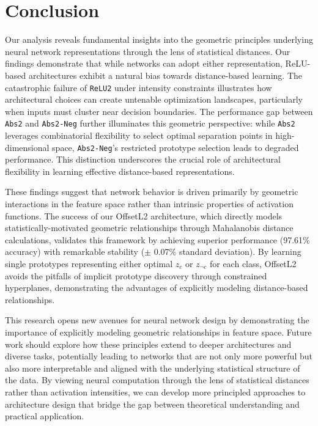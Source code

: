 \section{Conclusion}
\label{sec:conclusion}

Our analysis reveals fundamental insights into the geometric principles underlying neural network representations through the lens of statistical distances. Our findings demonstrate that while networks can adopt either representation, ReLU-based architectures exhibit a natural bias towards distance-based learning. The catastrophic failure of \texttt{ReLU2} under intensity constraints illustrates how architectural choices can create untenable optimization landscapes, particularly when inputs must cluster near decision boundaries. The performance gap between \texttt{Abs2} and \texttt{Abs2-Neg} further illuminates this geometric perspective: while \texttt{Abs2} leverages combinatorial flexibility to select optimal separation points in high-dimensional space, \texttt{Abs2-Neg}'s restricted prototype selection leads to degraded performance. This distinction underscores the crucial role of architectural flexibility in learning effective distance-based representations.

These findings suggest that network behavior is driven primarily by geometric interactions in the feature space rather than intrinsic properties of activation functions. The success of our OffsetL2 architecture, which directly models statistically-motivated geometric relationships through Mahalanobis distance calculations, validates this framework by achieving superior performance (97.61\% accuracy) with remarkable stability ($\pm$ 0.07\% standard deviation). By learning single prototypes representing either optimal $z_c$ or $z_{\neg c}$ for each class, OffsetL2 avoids the pitfalls of implicit prototype discovery through constrained hyperplanes, demonstrating the advantages of explicitly modeling distance-based relationships.

This research opens new avenues for neural network design by demonstrating the importance of explicitly modeling geometric relationships in feature space. Future work should explore how these principles extend to deeper architectures and diverse tasks, potentially leading to networks that are not only more powerful but also more interpretable and aligned with the underlying statistical structure of the data. By viewing neural computation through the lens of statistical distances rather than activation intensities, we can develop more principled approaches to architecture design that bridge the gap between theoretical understanding and practical application.